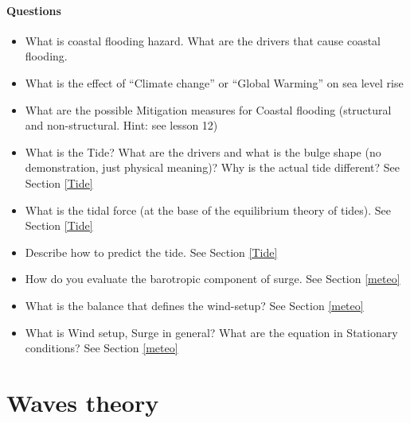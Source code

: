 \subsubsection*{Questions}
\begin{itemize}
\item What is coastal flooding hazard. What are the drivers that cause coastal flooding.
\item What is the effect of “Climate change” or “Global Warming” on sea level rise
\item What are the possible Mitigation measures for Coastal flooding (structural and non-structural. Hint: see lesson 12)
\item What is the Tide? What are the drivers and what is the bulge shape (no demonstration, just physical meaning)? Why is the actual tide different? See Section \ref{Tide}
\item What is the tidal force (at the base of the equilibrium theory of tides). See Section \ref{Tide}
\item Describe how to predict the tide. See Section \ref{Tide}
\item How do you evaluate the barotropic component of surge. See Section \ref{meteo}
\item What is the balance that defines the wind-setup? See Section \ref{meteo}
\item What is Wind setup, Surge in general? What are the equation in Stationary conditions? See Section \ref{meteo}
\end{itemize}
\chapter{Waves theory}

